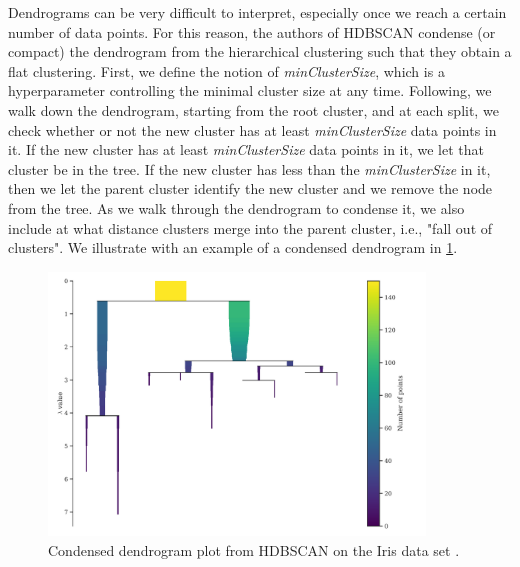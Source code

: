 Dendrograms can be very difficult to interpret, especially once we reach a certain number of data points. For this reason, the authors of HDBSCAN condense (or compact) the dendrogram from the hierarchical clustering such that they obtain a flat clustering. First, we define the notion of \textit{minClusterSize}, which is a hyperparameter controlling the minimal cluster size at any time. Following, we walk down the dendrogram, starting from the root cluster, and at each split, we check whether or not the new cluster has at least \textit{minClusterSize} data points in it. If the new cluster has at least \textit{minClusterSize} data points in it, we let that cluster be in the tree. If the new cluster has less than the \textit{minClusterSize} in it, then we let the parent cluster identify the new cluster and we remove the node from the tree. As we walk through the dendrogram to condense it, we also include at what distance clusters merge into the parent cluster, i.e., "fall out of clusters". We illustrate with an example of a condensed dendrogram in \cref{fig:hdbscan-condensed-dendrogram-example}.
\begin{figure}[H]
    \centering
    \includegraphics[width=10cm]{thesis/figures/hdbscan-condensed-tree-example.pdf}
    \caption{Condensed dendrogram plot from HDBSCAN on the Iris data set \cite{Fisher1936}.}
    \label{fig:hdbscan-condensed-dendrogram-example}
\end{figure}

